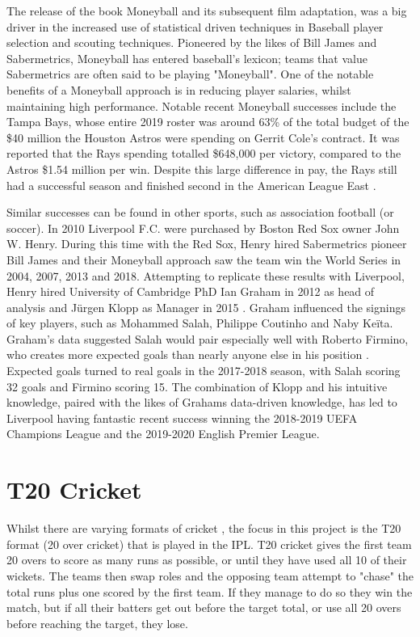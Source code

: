 \documentclass[12pt,a4paper]{report}
\theoremstyle{definition}
\begin{document}
The release of the book Moneyball \citep{Moneyball2004} and its subsequent film adaptation, was a big driver in the increased use of statistical driven techniques in Baseball player selection and scouting techniques. 
Pioneered by the likes of Bill James and Sabermetrics, Moneyball has entered baseball's lexicon; teams that value Sabermetrics are often said to be playing "Moneyball".  
One of the notable benefits of a Moneyball approach is in reducing player salaries, whilst maintaining high performance. 
Notable recent Moneyball successes include the Tampa Bays, whose entire 2019 roster was around 63\% of the total budget of the \$40 million the Houston Astros were spending on Gerrit Cole's contract. 
It was reported that the Rays spending totalled \$648,000 per victory, compared to the Astros \$1.54 million per win.
Despite this large difference in pay, the Rays still had a successful season and finished second in the American League East \citep{Fox2019}.

Similar successes can be found in other sports, such as association football (or soccer). 
In 2010 Liverpool F.C. were purchased by Boston Red Sox owner John W. Henry. 
During this time with the Red Sox, Henry hired Sabermetrics pioneer Bill James and their Moneyball approach saw the team win the World Series in 2004, 2007, 2013 and 2018. 
Attempting to replicate these results with Liverpool, Henry hired University of Cambridge PhD Ian Graham in 2012 as head of analysis and J\"urgen Klopp as Manager in 2015 \citep{Liverpool2022}. 
Graham influenced the signings of key players, such as Mohammed Salah, Philippe Coutinho and Naby Ke\"ita. 
Graham's data suggested Salah would pair especially well with Roberto Firmino, who creates more expected goals than nearly anyone else in his position \citep{Liverpool2019}. 
Expected goals turned to real goals in the 2017-2018 season, with Salah scoring 32 goals and Firmino scoring 15. 
The combination of Klopp and his intuitive knowledge, paired with the likes of Grahams data-driven knowledge, has led to Liverpool having fantastic recent success winning the 2018-2019 UEFA Champions League and the 2019-2020 English Premier League.

\section{T20 Cricket} \label{sec:T20Cricket}

Whilst there are varying formats of cricket \footnotemark{}, the focus in this project is the T20 format (20 over cricket) that is played in the IPL.
T20 cricket gives the first team 20 overs to score as many runs as possible, or until they have used all 10 of their wickets.
The teams then swap roles and the opposing team attempt to "chase" the total runs plus one scored by the first team. 
If they manage to do so they win the match, but if all their batters get out before the target total, or use all 20 overs before reaching the target, they lose.
\end{document}

